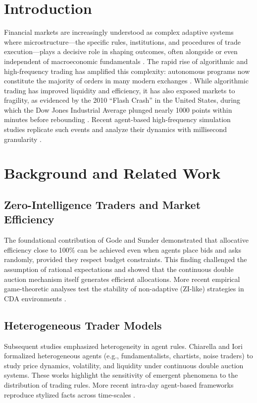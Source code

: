 \documentclass[conference, 12pt]{IEEEtran}
\begin{document}
\section{Introduction}
Financial markets are increasingly understood as complex adaptive systems where microstructure—the specific rules, institutions, and procedures of trade execution—plays a decisive role in shaping outcomes, often alongside or even independent of macroeconomic fundamentals \cite{hasbrouck2007empirical}. The rapid rise of algorithmic and high-frequency trading has amplified this complexity: autonomous programs now constitute the majority of orders in many modern exchanges \cite{qian2007quantitative}. While algorithmic trading has improved liquidity and efficiency, it has also exposed markets to fragility, as evidenced by the 2010 “Flash Crash” in the United States, during which the Dow Jones Industrial Average plunged nearly 1000 points within minutes before rebounding \cite{kirilenko2017flash}. Recent agent-based high-frequency simulation studies replicate such events and analyze their dynamics with millisecond granularity \cite{gao2022high}.

\section{Background and Related Work}
\subsection{Zero-Intelligence Traders and Market Efficiency}
The foundational contribution of Gode and Sunder \cite{gode1993allocative} demonstrated that allocative efficiency close to 100\% can be achieved even when agents place bids and asks randomly, provided they respect budget constraints. This finding challenged the assumption of rational expectations and showed that the continuous double auction mechanism itself generates efficient allocations. More recent empirical game-theoretic analyses test the stability of non-adaptive (ZI-like) strategies in CDA environments \cite{wright2018evaluating}.

\subsection{Heterogeneous Trader Models}
Subsequent studies emphasized heterogeneity in agent rules. Chiarella and Iori \cite{chiarella2009impact} formalized heterogeneous agents (e.g., fundamentalists, chartists, noise traders) to study price dynamics, volatility, and liquidity under continuous double auction systems. These works highlight the sensitivity of emergent phenomena to the distribution of trading rules. More recent intra-day agent-based frameworks reproduce stylized facts across time-scales \cite{staccioli2021agent}.
\end{document}
